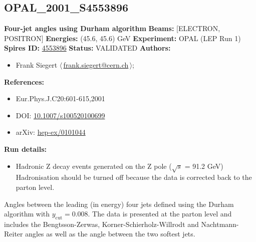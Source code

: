 \subsection[OPAL\_2001\_S4553896]{OPAL\_2001\_S4553896\,\cite{Abbiendi:2001qn}}
\textbf{Four-jet angles using Durham algorithm}\newline
\textbf{Beams:} [ELECTRON, POSITRON] \newline
\textbf{Energies:} (45.6, 45.6) GeV \newline
\textbf{Experiment:} OPAL (LEP Run 1) \newline
\textbf{Spires ID:} \href{http://www.slac.stanford.edu/spires/find/hep/www?rawcmd=key+4553896}{4553896}\newline
\textbf{Status:} VALIDATED\newline
\textbf{Authors:}
\begin{itemize}
  \item Frank Siegert $\langle\,$\href{mailto:frank.siegert@cern.ch}{frank.siegert@cern.ch}$\,\rangle$;
\end{itemize}
\textbf{References:}
\begin{itemize}
  \item Eur.Phys.J.C20:601-615,2001
  \item DOI: \href{http://dx.doi.org/10.1007/s100520100699}{10.1007/s100520100699}
  \item arXiv: \href{http://arxiv.org/abs/hep-ex/0101044}{hep-ex/0101044}
\end{itemize}
\textbf{Run details:}
\begin{itemize}

  \item Hadronic Z decay events generated on the Z pole (\ensuremath{\sqrt{s}} = 91.2 GeV) Hadronisation should be turned off because the data is corrected back to the parton level.\end{itemize}

\noindent Angles between the leading (in energy) four jets defined using the Durham algorithm with $y_\mathrm{cut}=0.008$. The data is presented at the parton level and includes the Bengtsson-Zerwas, Korner-Schierholz-Willrodt and Nachtmann-Reiter angles as well as the angle between the two softest jets.

\clearpage


\clearpage

